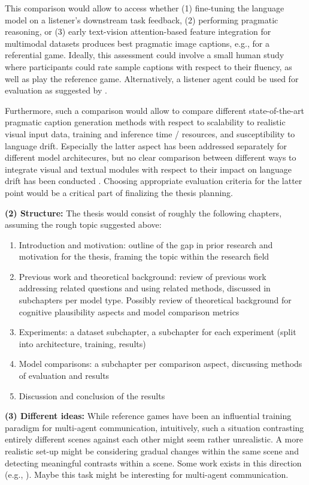 \documentclass[11pt,letterpaper]{article}
\begin{document}
This comparison would allow to access whether (1) fine-tuning the language model on a listener's downstream task feedback, (2) performing pragmatic reasoning, or (3) early text-vision attention-based feature integration for multimodal datasets produces best pragmatic image captions, e.g., for a referential game. Ideally, this assessment could involve a small human study where participants could rate sample captions with respect to their fluency, as well as play the reference game. Alternatively, a listener agent could be used for evaluation as suggested by \cite{lazaridou2020multi}.

Furthermore, such a comparison would allow to compare different state-of-the-art pragmatic caption generation methods with respect to scalability to realistic visual input data, training and inference time / resources, and susceptibility to language drift. Especially the latter aspect has been addressed separately for different model architecures, but no clear comparison between different ways to integrate visual and textual modules with respect to their impact on language drift has been conducted \cite{lu2020countering, lazaridou2020multi, lee2019countering}. Choosing appropriate evaluation criteria for the latter point would be a critical part of finalizing the thesis planning.

\textbf{(2) Structure:} The thesis would consist of roughly the following chapters, assuming the rough topic suggested above:
\begin{enumerate}
	\item Introduction and motivation: outline of the gap in prior research and motivation for the thesis, framing the topic within the research field
	\item Previous work and theoretical background: review of previous work addressing related questions and using related methods, discussed in subchapters per model type. Possibly review of theoretical background for cognitive plausibility aspects and model comparison metrics
	\item Experiments: a dataset subchapter, a subchapter for each experiment (split into architecture, training, results)
	\item Model comparisons: a subchapter per comparison aspect, discussing methods of evaluation and results
	\item Discussion and conclusion of the results
\end{enumerate} 
 
 \textbf{(3) Different ideas:} While reference games have been an influential training paradigm for multi-agent communication, intuitively, such a situation contrasting entirely different scenes against each other might seem rather unrealistic. A more realistic set-up might be considering gradual changes within the same scene and detecting meaningful contrasts within a scene. Some work exists in this direction (e.g., \cite{jhamtani2018learning}). Maybe this task might be interesting for multi-agent communication.
 
\end{document}

